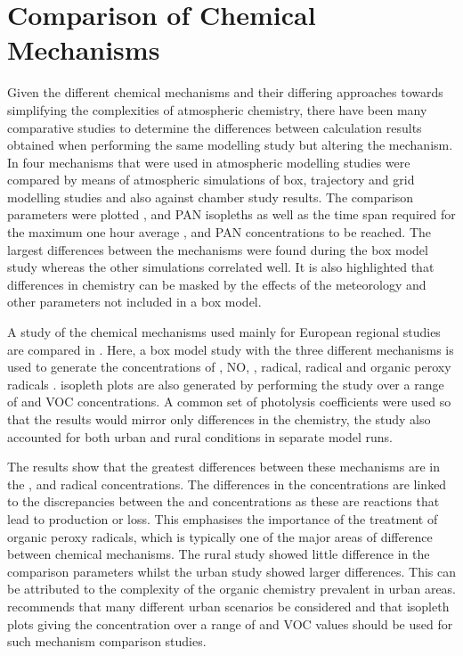 \section{Comparison of Chemical Mechanisms}
Given the different chemical mechanisms and their differing approaches towards simplifying the complexities of atmospheric 
chemistry, there have been many comparative studies to determine the differences between calculation results obtained when 
performing the same modelling study but altering the mechanism. In \citep{Dunker:1984} four mechanisms that were used in 
atmospheric modelling studies were compared by means of atmospheric simulations of box, trajectory and grid modelling studies 
and also against chamber study results. The comparison parameters were plotted ,  and PAN isopleths as well as 
the time span required for the maximum one hour average ,  and PAN concentrations to be reached. The largest 
differences between the mechanisms were found during the box model study whereas the other simulations correlated well. It is 
also highlighted that differences in chemistry can be masked by the effects of the meteorology and other parameters not included
in a box model.

A study of the chemical mechanisms used mainly for European regional studies are compared in \citep{Gross:2003}. Here, a box 
model study with the three different mechanisms is used to generate the concentrations of , NO, ,  
radical,  radical and organic peroxy radicals .  isopleth plots are also generated by performing the 
study over a range of  and VOC concentrations. A common set of photolysis coefficients were used so that the results 
would mirror only differences in the chemistry, the study also accounted for both urban and rural conditions in separate model 
runs.

The results show that the greatest differences between these mechanisms are in the ,  and  radical 
concentrations. The differences in the  concentrations are linked to the discrepancies between the  and  
concentrations as these are reactions that lead to  production or loss. This emphasises the importance of the treatment
of organic peroxy radicals, which is typically one of the major areas of difference between chemical mechanisms. The rural study
showed little difference in the comparison parameters whilst the urban study showed larger differences. This can be attributed 
to the complexity of the organic chemistry prevalent in urban areas. \citep{Gross:2003} recommends that many different urban 
scenarios be considered and that  isopleth plots giving the  concentration over a range of  and VOC 
values should be used for such mechanism comparison studies. 

